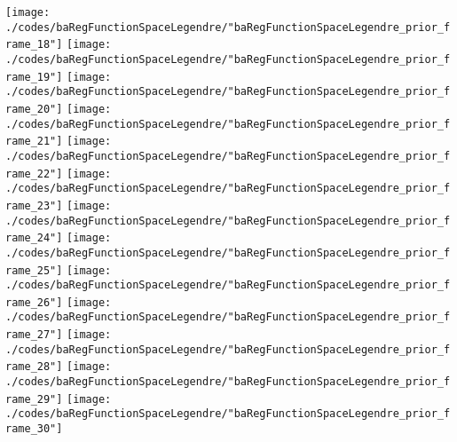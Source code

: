\begin{frame}{\insertsection}
\begin{center}
{\begin{animateinline}{15}
				 \texttt{[image: ./codes/baRegFunctionSpaceLegendre/"baRegFunctionSpaceLegendre\_prior\_frame\_18"]}\newframe
				 \texttt{[image: ./codes/baRegFunctionSpaceLegendre/"baRegFunctionSpaceLegendre\_prior\_frame\_19"]}\newframe
				 \texttt{[image: ./codes/baRegFunctionSpaceLegendre/"baRegFunctionSpaceLegendre\_prior\_frame\_20"]}\newframe
				 \texttt{[image: ./codes/baRegFunctionSpaceLegendre/"baRegFunctionSpaceLegendre\_prior\_frame\_21"]}\newframe
				 \texttt{[image: ./codes/baRegFunctionSpaceLegendre/"baRegFunctionSpaceLegendre\_prior\_frame\_22"]}\newframe
				 \texttt{[image: ./codes/baRegFunctionSpaceLegendre/"baRegFunctionSpaceLegendre\_prior\_frame\_23"]}\newframe
				 \texttt{[image: ./codes/baRegFunctionSpaceLegendre/"baRegFunctionSpaceLegendre\_prior\_frame\_24"]}\newframe
				 \texttt{[image: ./codes/baRegFunctionSpaceLegendre/"baRegFunctionSpaceLegendre\_prior\_frame\_25"]}\newframe
				 \texttt{[image: ./codes/baRegFunctionSpaceLegendre/"baRegFunctionSpaceLegendre\_prior\_frame\_26"]}\newframe
				 \texttt{[image: ./codes/baRegFunctionSpaceLegendre/"baRegFunctionSpaceLegendre\_prior\_frame\_27"]}\newframe
				 \texttt{[image: ./codes/baRegFunctionSpaceLegendre/"baRegFunctionSpaceLegendre\_prior\_frame\_28"]}\newframe
				 \texttt{[image: ./codes/baRegFunctionSpaceLegendre/"baRegFunctionSpaceLegendre\_prior\_frame\_29"]}\newframe
				 \texttt{[image: ./codes/baRegFunctionSpaceLegendre/"baRegFunctionSpaceLegendre\_prior\_frame\_30"]}
			 \end{animateinline}
			}
	\end{center}
    
\end{frame}

